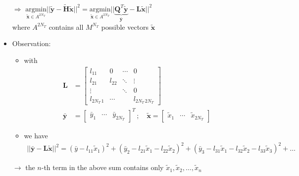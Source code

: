 \documentclass[a4paper, 10pt]{article}
\begin{document}
\begin{itemize}
\begin{align*}
	\end{align*}		 
	\item[$\Rightarrow $] $ \underset{\tilde{\mathbf{x}} \in A^{2N_T}}{\text{argmin}} ||\tilde{\mathbf{y}} - \tilde{\mathbf{H}}\tilde{\mathbf{x}}||^2 = \underset{\tilde{\mathbf{x}} \in A^{2N_T}}{\text{argmin}} ||\underbrace{\mathbf{Q}^T\tilde{\mathbf{y}}}_{\bar{\mathbf{y}}} - \mathbf{L}\tilde{\mathbf{x}}||^2$\\
	 where $A^{2N_T} $ contains all $ M^{N_T} $ possible vectors $\tilde{\mathbf{x}}$
	\item Observation:
	\begin{itemize}
		\item with
		\begin{align*}
			\mathbf{L} &= 
			\begin{bmatrix}
				l_{11} & 0 & \cdots & 0 \\
				l_{21} & l_{22} & \ddots &	\vdots \\
				\vdots & & \ddots & 0\\
				l_{2N_T\,1} & \cdots & & l_{2N_T\,2N_T}
			\end{bmatrix}\\
			\bar{\mathbf{y}} &= 
			 \begin{bmatrix}
			 	\bar{y}_1 & \cdots	& \bar{y}_{2N_T}
			 \end{bmatrix}^T \, ;\quad	
			 \tilde{\mathbf{x}} =
			 \begin{bmatrix}
			 	\tilde{x}_1 & \cdots	 & \tilde{x}_{2N_T}
			 \end{bmatrix}		 
		\end{align*}
		\item we have 
		\begin{align}\label{eq:Sphere_Decoding_01}
			||\bar{\mathbf{y}} - \mathbf{L}\tilde{\mathbf{x}}||^2 = (\bar{y} - l_{11}\tilde{x}_1)^2 + (\bar{y}_2 - l_{21}\tilde{x}_1 - l_{22}\tilde{x}_2)^2 + (\bar{y}_3 - l_{31}\tilde{x}_1 - l_{32}\tilde{x}_2 - l_{33}\tilde{x}_3)^2 + \ldots
		\end{align}
		\end{itemize}
		\item[$\rightarrow$] the $n$-th term in the above sum contains only $ \tilde{x}_1, \tilde{x}_2, \ldots,\tilde{x}_n $
\end{itemize}
\end{document}
